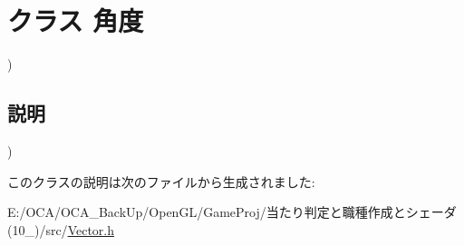 \hypertarget{class_xE8_xA7_x92_xE5_xBA_xA6}{\section{クラス 角度}
\label{class_xE8_xA7_x92_xE5_xBA_xA6}
}


)  




\subsection{説明}
) 

このクラスの説明は次のファイルから生成されました\-:\begin{DoxyCompactItemize}
\item 
E\-:/\-O\-C\-A/\-O\-C\-A\-\_\-\-Back\-Up/\-Open\-G\-L/\-Game\-Proj/当たり判定と職種作成とシェーダ(10\-\_)/src/\hyperlink{_vector_8h}{Vector.\-h}\end{DoxyCompactItemize}
